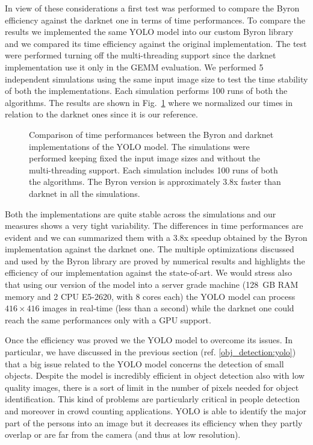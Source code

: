 \documentclass{standalone}
\begin{document}
In view of these considerations a first test was performed to compare the \textsf{Byron} efficiency against the \textsf{darknet} one in terms of time performances.
To compare the results we implemented the same YOLO model into our custom \textsf{Byron} library and we compared its time efficiency against the original implementation.
The test were performed turning off the multi-threading support since the \textsf{darknet} implementation use it only in the GEMM evaluation.
We performed 5 independent simulations using the same input image size to test the time stability of both the implementations.
Each simulation performs 100 runs of both the algorithms.
The results are shown in Fig.~\ref{fig:yolo_time} where we normalized our times in relation to the \textsf{darknet} ones since it is our reference.

\begin{figure}[htbp]
\centering
\def\svgwidth{0.85\textwidth}

\caption{Comparison of time performances between the \textsf{Byron} and \textsf{darknet} implementations of the YOLO model.
The simulations were performed keeping fixed the input image sizes and without the multi-threading support.
Each simulation includes 100 runs of both the algorithms.
The \textsf{Byron} version is approximately 3.8x faster than \textsf{darknet} in all the simulations.
}
\label{fig:yolo_time}
\end{figure}

Both the implementations are quite stable across the simulations and our measures shows a very tight variability.
The differences in time performances are evident and we can summarized them with a 3.8x speedup obtained by the \textsf{Byron} implementation against the \textsf{darknet} one.
The multiple optimizations discussed and used by the \textsf{Byron} library are proved by numerical results and highlights the efficiency of our implementation against the state-of-art.
We would stress also that using our version of the model into a server grade machine (128~GB RAM memory and 2 CPU E5-2620, with 8 cores each) the YOLO model can process $416\times416$ images in real-time (less than a second) while the \textsf{darknet} one could reach the same performances only with a GPU support.

Once the efficiency was proved we  the YOLO model to overcome its issues.
In particular, we have discussed in the previous section (ref. \ref{obj_detection:yolo}) that a big issue related to the YOLO model concerns the detection of small objects.
Despite the model is incredibly efficient in object detection also with low quality images, there is a sort of limit in the number of pixels needed for object identification.
This kind of problems are particularly critical in people detection and moreover in crowd counting applications.
YOLO is able to identify the major part of the persons into an image but it decreases its efficiency when they partly overlap or are far from the camera (and thus at low resolution).
\end{document}
